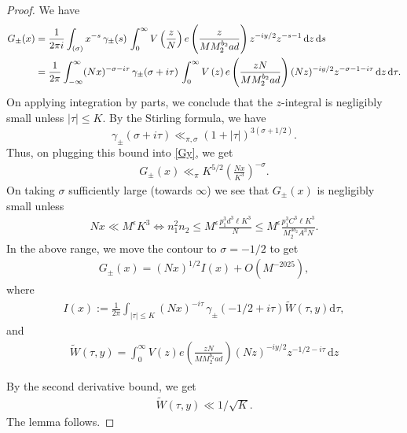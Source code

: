\documentclass[12pt,a4paper,twoside, reqno]{amsart}
\begin{document}
\begin{proof}
	We have 
	\begin{align}\label{Gy}
		G_{\pm}(x) &= \frac{1}{2 \pi i} \int_{(\sigma)} x^{-s} \, \gamma_{\pm}(s) \, \int_{0}^{\infty} V \left( \frac{z}{N}\right) e\left(\frac{z }{MM_2^{b_2}ad} \right)z^{-iy/2}  z^{-s-1} \, \mathrm{d}z\, \mathrm{d}s  \notag\\
		&= \frac{1}{2 \pi } \int_{-\infty}^{\infty} (Nx)^{-\sigma-i\tau} \, \gamma_{\pm}(\sigma+i\tau) \, \int_{0}^{\infty}  V \left( {z}{}\right) e\left(\frac{zN }{MM_2^{b_2}ad} \right)(Nz)^{-iy/2} z^{-\sigma-1-i\tau} \, \mathrm{d}z\, \mathrm{d}\tau.
	\end{align}
	On applying integration by parts, we conclude that the $z$-integral is negligibly small unless $|\tau| \leq  K.$
	By the  Stirling formula, we have  
	$$\gamma_{\pm}(\sigma+i\tau) \ll_{\pi,\sigma} (1+|\tau|)^{3(\sigma+1/2)}.$$
	Thus, on plugging this bound into \eqref{Gy}, we get 
	\begin{align}
		G_{\pm}(x)  \ll_{\pi} K^{5/2}  \left(\frac{Nx}{K^3 }\right)^{-\sigma}. 
	\end{align}
	  On taking   $\sigma $ sufficiently large (towards $\infty$) we see that $G_{\pm}(x) $ is negligibly small unless
	\begin{align}\label{N0}
		Nx \ll M^{\epsilon}K^3  \iff n_1^2n_2 \leq M^{\epsilon} \frac{p_1^3 d^3\ell K^3 }{N} \leq M^\epsilon \frac{p_1^3 C^3\ell K^3 }{M_2^{3b_2} A^3N}.
	\end{align}
	In the above range, we move the contour to $\sigma=-1/2$ to get 
	\begin{align}
		G_{\pm} \left(x\right) = \left( Nx\right)^{1/2} I{(x)}+O(M^{-2025}) ,
	\end{align}
	where 
	\begin{align}\label{integral of gl3}
		I(x):=	\frac{1}{2 \pi } \int_{|\tau| \leq K}  \left( Nx\right)^{-i\tau} \, \gamma_{\pm}(-1/2+i\tau)\widetilde{W}(\tau,y)  \mathrm{d}\tau ,
	\end{align}
	and 
	\begin{align}
		\widetilde{W}(\tau,y )= \int_{0}^{\infty}  V \left( {z}{}\right) e\left(\frac{zN }{MM_2^{b_2}ad} \right)(Nz)^{-iy/2} z^{-1/2-i\tau} \, \mathrm{d}z
	\end{align}

By the second derivative bound, we get 
\begin{align}\label{second der}
    \widetilde{W}(\tau,y) \ll 1/\sqrt{K}.
\end{align}
The lemma follows. 
\end{proof} 
\end{document}
